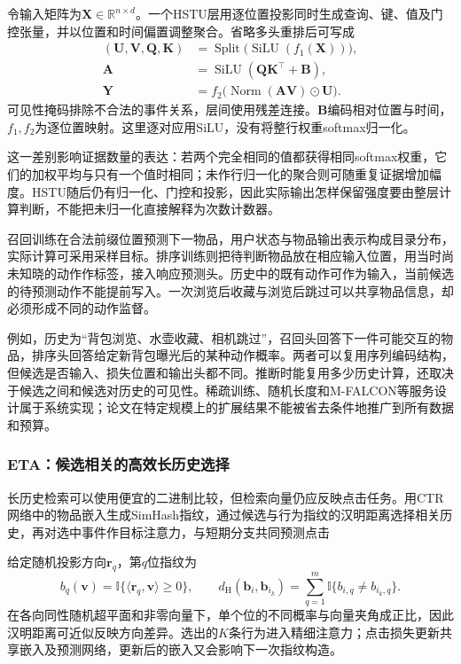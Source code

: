 令输入矩阵为$\bm{X}\in\mathbb{R}^{n\times d}$。一个HSTU层用逐位置投影同时生成查询、键、值及门控张量，并以位置和时间偏置调整聚合。省略多头重排后可写成
\begin{align}
  (\bm{U},\bm{V},\bm{Q},\bm{K})
    &=\operatorname{Split}\bigl(\operatorname{SiLU}(f_1(\bm{X}))\bigr),\\
  \bm{A}&=\operatorname{SiLU}(\bm{Q}\bm{K}^{\top}+\bm{B}),\\
  \bm{Y}&=f_2\bigl(\operatorname{Norm}(\bm{A}\bm{V})\odot\bm{U}\bigr).
  \label{eq:rs-hstu}
\end{align}
可见性掩码排除不合法的事件关系，层间使用残差连接。$\bm{B}$编码相对位置与时间，$f_1,f_2$为逐位置映射。这里逐对应用SiLU，没有将整行权重softmax归一化。

这一差别影响证据数量的表达：若两个完全相同的值都获得相同softmax权重，它们的加权平均与只有一个值时相同；未作行归一化的聚合则可随重复证据增加幅度。HSTU随后仍有归一化、门控和投影，因此实际输出怎样保留强度要由整层计算判断，不能把未归一化直接解释为次数计数器。

召回训练在合法前缀位置预测下一物品，用户状态与物品输出表示构成目录分布，实际计算可采用采样目标。排序训练则把待判断物品放在相应输入位置，用当时尚未知晓的动作作标签，接入响应预测头。历史中的既有动作可作为输入，当前候选的待预测动作不能提前写入。一次浏览后收藏与浏览后跳过可以共享物品信息，却必须形成不同的动作监督。

例如，历史为“背包浏览、水壶收藏、相机跳过”，召回头回答下一件可能交互的物品，排序头回答给定新背包曝光后的某种动作概率。两者可以复用序列编码结构，但候选是否输入、损失位置和输出头都不同。推断时能复用多少历史计算，还取决于候选之间和候选对历史的可见性。稀疏训练、随机长度和M-FALCON等服务设计属于系统实现；论文在特定规模上的扩展结果不能被省去条件地推广到所有数据和预算。

\subsubsection{ETA：候选相关的高效长历史选择}
\label{sec:rs-eta}

长历史检索可以使用便宜的二进制比较，但检索向量仍应反映点击任务。用CTR网络中的物品嵌入生成SimHash指纹，通过候选与行为指纹的汉明距离选择相关历史，再对选中事件作目标注意力，与短期分支共同预测点击

给定随机投影方向$\bm{r}_q$，第$q$位指纹为
\begin{equation}
  b_q(\bm{v})=\mathbb{I}\{\langle\bm{r}_q,\bm{v}\rangle\geq0\},
  \qquad
  d_{\mathrm{H}}(\bm{b}_i,\bm{b}_{i_k})
     =\sum_{q=1}^{m}\mathbb{I}\{b_{i,q}\ne b_{i_k,q}\}.
  \label{eq:rs-eta-hash}
\end{equation}
在各向同性随机超平面和非零向量下，单个位的不同概率与向量夹角成正比，因此汉明距离可近似反映方向差异。选出的$K$条行为进入精细注意力；点击损失更新共享嵌入及预测网络，更新后的嵌入又会影响下一次指纹构造。

